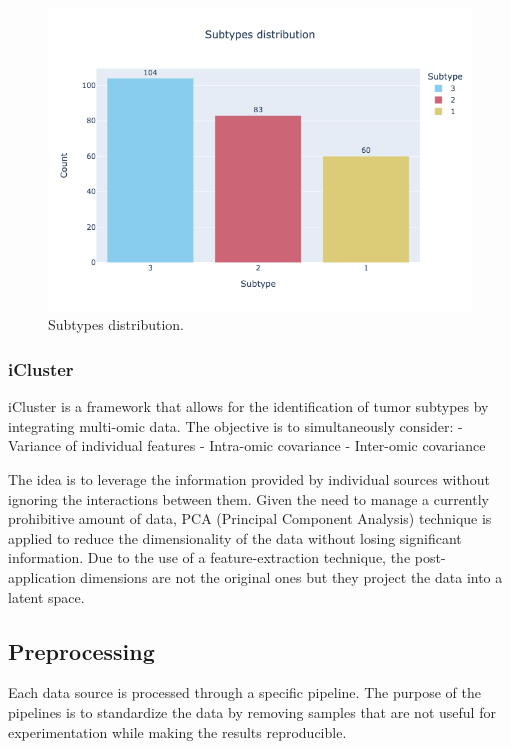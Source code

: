 \documentclass[12pt,a4paper]{article}
\begin{document}
\begin{figure}[htbp!]
\begin{center}
\includegraphics[width=0.9\columnwidth]{./static/subtypes_distribution.png}
\end{center}
\caption{Subtypes distribution.}
\label{fig:subtypes_distribution}
\end{figure}

\subsubsection{iCluster}
iCluster \cite{Shen2009} is a framework that allows for the identification of tumor subtypes by integrating multi-omic data. The objective is to simultaneously consider:
- Variance of individual features
- Intra-omic covariance
- Inter-omic covariance

The idea is to leverage the information provided by individual sources without ignoring the interactions between them.
Given the need to manage a currently prohibitive amount of data, PCA (Principal Component Analysis) technique is applied to reduce the dimensionality of the data without losing significant information. Due to the use of a feature-extraction technique, the post-application dimensions are not the original ones but they project the data into a latent space.

\subsection{Preprocessing}
Each data source is processed through a specific pipeline. The purpose of the pipelines is to standardize the data by removing samples that are not useful for experimentation while making the results reproducible.
\end{document}

